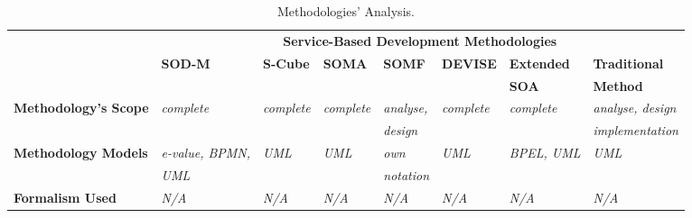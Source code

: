 

\begin{table}
\caption{Methodologies' Analysis.} %
\label{tab:method_analysis}
\begin{tabular}{l|l|l|l|l|l|l|l|l} 
\hline 
\hline

\multicolumn{2}{l|}{\multirow{2}{*}{}} &
\multicolumn{7}{|c}{\textbf{Service-Based Development Methodologies}} \\ \cline{3-9}

\multicolumn{2}{l|}{} & \textbf{SOD-M \cite{valeriaThesis}} & \textbf{S-Cube
\cite{scube2010book}} & \textbf{SOMA \cite{soma}} & \textbf{SOMF \cite{somf}} &
\textbf{DEVISE \cite{Dhyanesh003}} & \textbf{Extended}
& \textbf{Traditional} \\
\multicolumn{2}{l|}{} &  &  &  &  &
 & \textbf{SOA \cite{PapazoglouH06}}
& \textbf{Method \cite{sommerville08}} \\
\hline
 
\multicolumn{2}{l|}{ \textbf{ Methodology's Scope}} & \textit{complete} &
 \textit{complete} & \textit{complete} & \textit{analyse,} & \textit{complete} &
 \textit{complete} &  \textit{analyse, design} \\
 
 \multicolumn{2}{l|}{} &  &  & & \textit{design} & & & 
 \textit{implementation} \\
 
 \hline
 
 \multicolumn{2}{l|}{\textbf{Methodology Models}} & \textit{e-value,
 BPMN,}  & \textit{UML} &\textit{UML} & \textit{own} &  \textit{UML} &  \textit{BPEL, UML} & 
 \textit{UML} \\ 
 \multicolumn{2}{l|}{} & \textit{UML}  &  & & \textit{notation} & & & \\

 \hline
 
 \multicolumn{2}{l|}{\textbf{ Formalism Used}} & \textit{N/A}  &
 \textit{N/A} &\textit{N/A} & \textit{N/A} &  \textit{N/A} &  \textit{N/A} & 
 \textit{N/A} \\ 
 
 \hline
 

\end{tabular}
\end{table}
